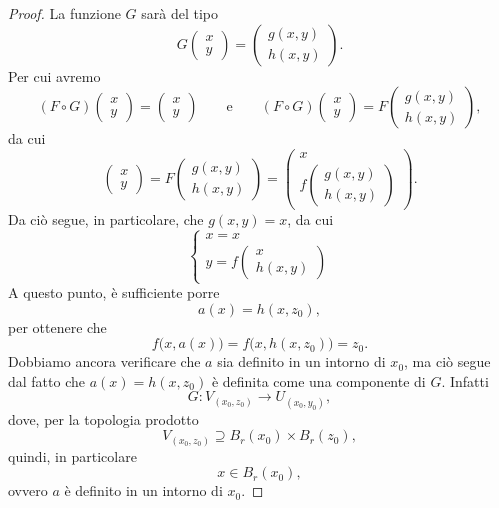 \begin{proof}
	La funzione \(G\) sarà del tipo
	\[
		G 	\begin{pmatrix}x\\y\end{pmatrix} = 	\begin{pmatrix}
			g(x,y) \\
			h(x,y)
		\end{pmatrix}.
	\]
	Per cui avremo
	\[
		(F\circ G) \begin{pmatrix}x\\y\end{pmatrix} = \begin{pmatrix}x\\y\end{pmatrix} \qquad\text{e}\qquad (F\circ G) \begin{pmatrix}x\\y\end{pmatrix} = F \begin{pmatrix}g(x,y)\\h(x,y)\end{pmatrix},
	\]
	da cui
	\[
		\begin{pmatrix}x\\y\end{pmatrix} = F \begin{pmatrix}g(x,y)\\h(x,y)\end{pmatrix} = 	\begin{pmatrix}
			x \\
			f \begin{pmatrix}g(x,y)\\h(x,y)\end{pmatrix}
		\end{pmatrix}.
	\]
	Da ciò segue, in particolare, che \(g(x,y)=x\), da cui
	\[
		\begin{cases}
			x = x \\
			y = f 	\begin{pmatrix}
				       x \\
				       h(x,y)
			       \end{pmatrix}
		\end{cases}
	\]
	A questo punto, è sufficiente porre
	\[
		a(x) = h(x,z_0),
	\]
	per ottenere che
	\[
		f\big(x,a(x)\big) = f\big(x,h(x,z_0)\big) = z_0.
	\]
	Dobbiamo ancora verificare che \(a\) sia definito in un intorno di \(x_0\), ma ciò segue dal fatto che \(a(x)=h(x,z_0)\) è definita come una componente di \(G\).
	Infatti
	\[
		G\colon V_{(x_0,z_0)} \to U_{(x_0,y_0)},
	\]
	dove, per la topologia prodotto
	\[
		V_{(x_0,z_0)} \supseteq B_r(x_0) \times B_r(z_0),
	\]
	quindi, in particolare
	\[
		x \in B_r(x_0),
	\]
	ovvero \(a\) è definito in un intorno di \(x_0\).


\end{proof}
